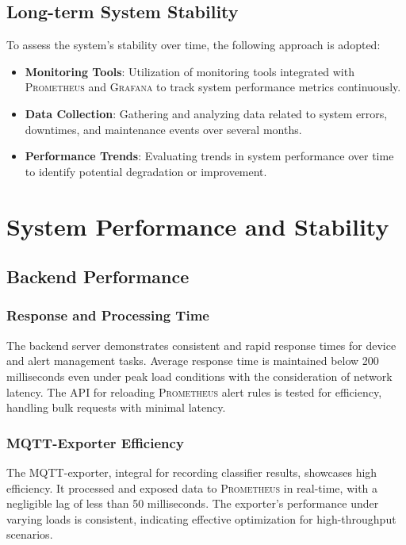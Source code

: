\subsection{Long-term System Stability}
To assess the system's stability over time, the following approach is adopted:

\begin{itemize}
  \item \textbf{Monitoring Tools}: Utilization of monitoring tools integrated with \textsc{Prometheus} and \textsc{Grafana} to track system performance metrics continuously.
  \item \textbf{Data Collection}: Gathering and analyzing data related to system errors, downtimes, and maintenance events over several months.
  \item \textbf{Performance Trends}: Evaluating trends in system performance over time to identify potential degradation or improvement.
\end{itemize}

\section{System Performance and Stability}
\subsection{Backend Performance}
\subsubsection{Response and Processing Time}

The backend server demonstrates consistent and rapid response times for device and alert management tasks. Average response time is maintained below 200 milliseconds even under peak load conditions with the consideration of network latency. The API for reloading \textsc{Prometheus} alert rules is tested for efficiency, handling bulk requests with minimal latency.
\subsubsection{MQTT-Exporter Efficiency}

The MQTT-exporter, integral for recording classifier results, showcases high efficiency. It processed and exposed data to \textsc{Prometheus} in real-time, with a negligible lag of less than 50 milliseconds. The exporter's performance under varying loads is consistent, indicating effective optimization for high-throughput scenarios.

